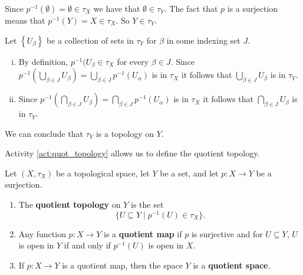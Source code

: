 
\ActivitySolution

\ba
\item Since $p^{-1}(\emptyset) = \emptyset \in \tau_X$ we have that $\emptyset \in \tau_Y$. The fact that $p$ is a surjection means that $p^{-1}(Y) = X \in \tau_X$. So $Y \in \tau_Y$.

\item Let $\left\{U_{\beta}\right\}$ be a collection of sets in $\tau_Y$ for $\beta$ in some indexing set $J$. 
	\begin{enumerate}[i.]
	\item By definition, $p^{-1}(U_{\beta} \in \tau_X$ for every $\beta \in J$. Since $p^{-1}\left(\bigcup_{\beta \in J} U_{\beta}\right) = \bigcup_{\beta \in J} p^{-1}\left(U_{\alpha}\right)$ is in $\tau_X$ it follows that $\bigcup_{\beta \in J} U_{\beta}$ is in $\tau_Y$.
	
	\item Since $p^{-1}\left(\bigcap_{\beta \in J} U_{\beta}\right) = \bigcap_{\beta \in J} p^{-1}\left(U_{\alpha}\right)$ is in $\tau_X$ it follows that $\bigcap_{\beta \in J} U_{\beta}$ is in $\tau_Y$.
	
	\end{enumerate}
	
\item We can conclude that $\tau_Y$ is a topology on $Y$. 

\ea


Activity \ref{act:quot_topology} allows us to define the quotient topology.

\begin{definition} Let $(X,\tau_X)$ be a topological space, let $Y$ be a set, and let $p: X \to Y$ be a surjection. 
\begin{enumerate}
\item The \textbf{quotient topology} on $Y$ is the set
\[\{U \subseteq Y \mid p^{-1}(U) \in \tau_X\}.\]
\item Any function $p: X \to Y$ is a \textbf{quotient map} if $p$ is surjective and for $U \subseteq Y$,  $U$ is open in $Y$ if and only if $p^{-1}(U)$ is open in $X$. 
\item If $p: X \to Y$ is a quotient map, then the space $Y$ is a \textbf{quotient space}. 
\end{enumerate}
\end{definition}


